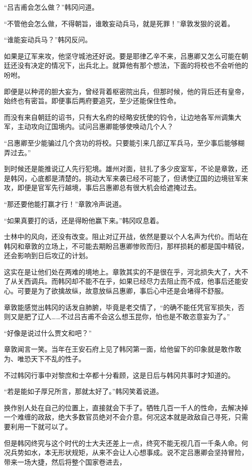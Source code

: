 “吕吉甫会怎么做？”韩冈问道。

“不管他会怎么做，不得朝旨，谁敢妄动兵马，就是死罪！”章敦发狠的说着。

“谁能妄动兵马？”韩冈反问。

如果是辽军来攻，他坚守城池还好说。要是耶律乙辛不来，吕惠卿又怎么可能在朝廷还没有决定的情况下，出兵北上。就算他有那个想法，下面的将校也不会听他的吩咐。

即便是以种谔的胆大妄为，曾经背着枢密院出兵，但那时候，他的背后还有皇帝，始终也有密旨。即便事后两府要追究，至少还能保住性命。

而没有来自朝廷的诏书，只有大名府的经略安抚使的钧令，让边地各军州调集大军，主动攻向辽国境内。试问吕惠卿能够使唤动几个人？

“吕惠卿至少能骗过几个贪功的将校。只要能引来几部辽军兵马，至少事后能够糊弄过去。”

到时候还是能推说辽人先行犯境。雄州对面，驻扎了多少皮室军，不论是章敦，还是韩冈，心底都是清楚的。挑动大军来袭已经不可能了，但诱使辽国的边境驻军来攻，即便是官军先行越境，事后吕惠卿总有很大机会给遮掩过去。

“那还要他能打赢才行！”章敦冷声说道。

“如果真要打的话，还是得盼他赢下来。”韩冈叹息着。

士林中的风向，还没有改变。阻止对辽开战，依然是要以个人名声为代价。而站在韩冈和章敦的立场上，不可能去期盼吕惠卿惨败而归，那样损耗的都是国中精锐，还会影响到日后攻辽的计划。

这实在是让他们处在两难的境地上。章敦其实的不是很在乎，河北损失大了，大不了从关西调兵。而韩冈却不能不在乎，如果已经尽力去阻止而不成，他事后还能安心。可要是为了欲擒故纵，故意放纵吕惠卿，事后心中还是会堵得不舒服。

章敦能感觉出韩冈的话发自肺腑，毕竟是老交情了，“的确不能任凭官军损失，否则又是肥了辽人……不过吕吉甫不会这么想玉昆你，怕也是不敢恣意妄为了。”

“好像是说过什么贾文和吧？”

章敦闻言一笑。当年在王安石府上见了韩冈第一面，给他留下的印象就是敢作敢为、唯恐天下不乱的性子。

不过韩冈行事中对黎庶和士卒都十分看顾，这是日后与韩冈共事时才知道的。

“若是能如子厚兄所言，那就太好了。”韩冈笑着说道。

换作别人处在自己的位置上，直接就会下手了。牺牲几百一千人的性命，去解决掉一个难缠的政敌，绝大多数官员绝对不会介意。何况这本就是政敌自己寻死，只需要利用一下就可以了。

但是韩冈终究与这个时代的士大夫还差上一点，终究不能无视几百一千条人命。何况兵势如水，本无形状规矩，从来不会让人心想事成。说不定吕惠卿会坚持冒险，带来一场大捷，然后将整个国家卷进去，

